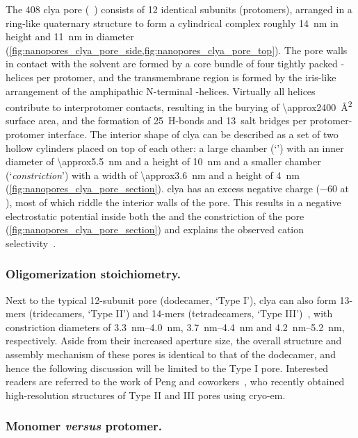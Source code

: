 The \SI{408}{\kDa} \gls{clya} pore (~\cite{Peng-2019}) consists of 12 identical subunits
(protomers), arranged in a ring-like quaternary structure to form a cylindrical complex roughly \SI{14}{\nm}
in height and \SI{11}{\nm} in diameter (\cref{fig:nanopores_clya_pore_side,fig:nanopores_clya_pore_top}). The
pore walls in contact with the solvent are formed by a core bundle of four tightly packed \ta-helices per
protomer, and the transmembrane region is formed by the iris-like arrangement of the amphipathic N-terminal
\ta-helices. Virtually all helices contribute to interprotomer contacts, resulting in the burying of
\SI{\approx2400}{\square\angstrom} surface area, and the formation of 25~H-bonds and 13~salt bridges per
protomer-protomer interface. The interior shape of \gls{clya} can be described as a set of two hollow
cylinders placed on top of each other: a large \cisi{} chamber (`\lumen{}') with an inner diameter of
\SI{\approx5.5}{\nm} and a height of \SI{10}{\nm} and a smaller \transi{} chamber (`\textit{constriction}')
with a width of \SI{\approx3.6}{\nm} and a height of \SI{4}{\nm} (\cref{fig:nanopores_clya_pore_section}).
\Gls{clya} has an excess negative charge (\SI{-60}{\ec} at ), most of which riddle the interior walls
of the pore. This results in a negative electrostatic potential inside both the \lumen{} and the constriction
of the pore (\cref{fig:nanopores_clya_pore_section}) and explains the observed cation
selectivity~\cite{Soskine-2012,Franceschini-2016}.

\subsubsection{Oligomerization stoichiometry.}
%

Next to the typical 12-subunit pore (dodecamer, `Type I'), \gls{clya} can also form 13-mers (tridecamers,
`Type II') and 14-mers (tetradecamers, `Type III')~\cite{Soskine-2013,Peng-2019}, with constriction diameters
of \SIrange{3.3}{4.0}{\nm}, \SIrange{3.7}{4.4}{\nm} and \SIrange{4.2}{5.2}{\nm}, respectively. Aside from
their increased aperture size, the overall structure and assembly mechanism of these pores is identical to
that of the dodecamer, and hence the following discussion will be limited to the Type I pore. Interested
readers are referred to the work of Peng and coworkers~\cite{Peng-2019}, who recently obtained high-resolution
structures of Type II and III pores using \gls{cryo-em}.


\subsubsection{Monomer \textit{versus} protomer.}
%


